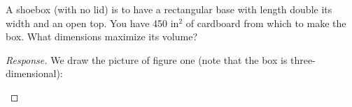 \documentclass[11pt]{exam}
\begin{document}
\begin{questions}

\addpoints
\vspace*{-120pt}
\question[8]\begin{changemargin}{0pt}{137.4803pt}
 A shoebox (with no lid) is to have a rectangular base with length double its width and an open top. You have 450 in${}^2$ of cardboard from which to make the box. What dimensions maximize its volume?\end{changemargin}\vspace{60pt}
\begin{proof}[Response]
	We draw the picture of figure one (note that the box is three-dimensional):\begin{figure}[h!]\begin{centering}

\end{centering}
\end{figure}
\end{proof}
\end{questions}
\end{document}
